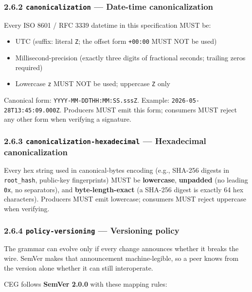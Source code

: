 \documentclass[11pt]{article}
\begin{document}
\subsubsection*{2.6.2 \texttt{canonicalization} — Date-time canonicalization}


Every ISO 8601 / RFC 3339 datetime in this specification MUST be:


\begin{itemize}\setlength\itemsep{0pt}
\item UTC (suffix: literal \texttt{Z}; the offset form \texttt{+00:00} MUST NOT be used)
\item Millisecond-precision (exactly three digits of fractional seconds; trailing zeros required)
\item Lowercase \texttt{z} MUST NOT be used; uppercase \texttt{Z} only
\end{itemize}


Canonical form: \texttt{YYYY-MM-DDTHH:MM:SS.sssZ}. Example: \texttt{2026-05-28T13:45:09.000Z}. Producers MUST emit this form; consumers MUST reject any other form when verifying a signature.


\subsubsection*{2.6.3 \texttt{canonicalization-hexadecimal} — Hexadecimal canonicalization}


Every hex string used in canonical-bytes encoding (e.g., SHA-256 digests in \texttt{root\_hash}, public-key fingerprints) MUST be \textbf{lowercase}, \textbf{unpadded} (no leading \texttt{0x}, no separators), and \textbf{byte-length-exact} (a SHA-256 digest is exactly 64 hex characters). Producers MUST emit lowercase; consumers MUST reject uppercase when verifying.


\subsubsection*{2.6.4 \texttt{policy-versioning} — Versioning policy}


The grammar can evolve only if every change announces whether it breaks the wire. SemVer makes that announcement machine-legible, so a peer knows from the version alone whether it can still interoperate.


CEG follows \textbf{SemVer 2.0.0} with these mapping rules:
\end{document}
